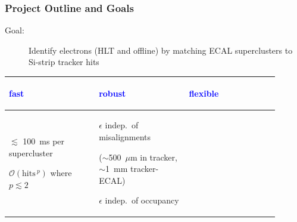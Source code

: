 \documentclass[12pt,compress]{beamer}
\begin{document}
\begin{frame}
\frametitle{Project Outline and Goals}

\begin{description}
\item[Goal:] Identify electrons (HLT and offline) by matching ECAL
superclusters to Si-strip tracker hits
\end{description}

\begin{center}
\begin{tabular}{p{0.3\linewidth} p{0.3\linewidth} p{0.3\linewidth}}
\begin{minipage}{\linewidth} \begin{center} \textcolor{blue}{fast} \end{center} \end{minipage} & 
\begin{minipage}{\linewidth} \begin{center} \textcolor{blue}{robust} \end{center} \end{minipage} & 
\begin{minipage}{\linewidth} \begin{center} \textcolor{blue}{flexible} \end{center} \end{minipage} \\\hline
\begin{minipage}{\linewidth} \begin{center}

\vspace{0.25 cm} \small $\lesssim$ 100~ms per supercluster

\vspace{0.5 cm} $\mathcal{O}(\mbox{hits}\,^p)$ where $p \lesssim 2$
\end{center} \end{minipage} & 
\begin{minipage}{\linewidth} \begin{center}

\vspace{0.25 cm} \small $\epsilon$ indep.\ of misalignments

{\scriptsize ($\sim$500~$\mu$m in tracker, $\sim$1~mm tracker-ECAL)}

\vspace{0.5 cm} $\epsilon$ indep.\ of occupancy

\end{center} \end{minipage} &
\begin{minipage}{\linewidth} \begin{center}


\end{center}
\end{minipage}
\end{tabular}
\end{center}
\end{frame}
\end{document}
